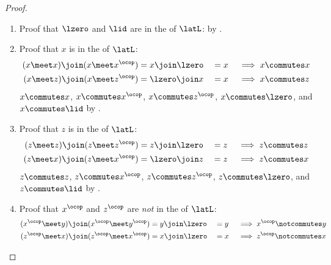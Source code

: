 \begin{example}
\end{example}
\begin{proof}
\begin{enumerate}
  \item Proof that $\lzero$ and $\lid$ are in the  of $\latL$: by .

  \item Proof that $x$ is in the  of $\latL$: 
    \begin{align*}
      (x \meet x)       \join (x \meet x^\ocop)      &= x      \join \lzero &&= x  &&\implies x \commutes x       \\
      (x \meet z)       \join (x \meet z^\ocop)      &= \lzero \join x      &&= x  &&\implies x \commutes z       \\
    \end{align*}
    $x\commutes x$, $x\commutes x^\ocop$, $x \commutes z^\ocop$, $x\commutes\lzero$, and $x\commutes\lid$ by .

  \item Proof that $z$ is in the  of $\latL$: 
    \begin{align*}
      (z \meet z)       \join (z \meet z^\ocop)      &= z\join \lzero       &&= z &&\implies z \commutes z       \\
      (z \meet x)       \join (z \meet x^\ocop)      &= \lzero \join z      &&= z &&\implies z \commutes x       \\
    \end{align*}
    $z\commutes z$, $z\commutes x^\ocop$, $z \commutes z^\ocop$, $z\commutes\lzero$, and $z\commutes\lid$ by .

  \item Proof that $x^\ocop$ and $z^\ocop$ are \emph{not} in the  of $\latL$:
    \begin{align*}
      (x^\ocop \meet y) \join (x^\ocop \meet y^\ocop)  &= y \join \lzero &&= y &&\implies x^\ocop \notcommutes y   \\
      (z^\ocop \meet x) \join (z^\ocop \meet x^\ocop)  &= x \join \lzero &&= x &&\implies z^\ocop \notcommutes x   
    \end{align*}

\end{enumerate}
\end{proof}


